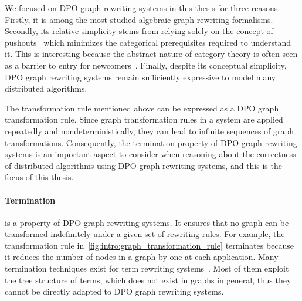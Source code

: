    We focused on DPO graph rewriting systems in this thesis for three reasons.
   Firstly, it is among the most studied algebraic graph rewriting formalisms.
   Secondly, its relative simplicity stems from relying solely on the concept of pushouts~\cite{pierce1991basic} which minimizes the categorical prerequisites required to understand it. This is interesting because the abstract nature of category theory is often seen as a barrier to entry for newcomers~\cite{overbeekthesis}.
    Finally, despite its conceptual simplicity, DPO graph rewriting systems remain sufficiently expressive to model many distributed algorithms.

    The transformation rule mentioned above can be expressed as a DPO graph transformation rule. Since graph transformation rules in a system are applied repeatedly and nondeterministically, they can lead to infinite sequences of graph transformations. 
    Consequently, the termination property of DPO graph rewriting systems is an important aspect to consider when reasoning about the correctness of distributed algorithms using DPO graph rewriting systems, and this is the focus of this thesis.

\paragraph{Termination} is a property of DPO graph rewriting systems. It ensures that no graph can be transformed indefinitely under a given set of rewriting rules. For example, the transformation rule in~\autoref{fig:intro:graph_transformation_rule} terminates because it reduces the number of nodes in a graph by one at each application. 
Many termination techniques exist for term rewriting systems~\cite{nipkow1998term, dershowitz1982orderings, middeldorp1997simple, arts2000termination}. 
 Most of them exploit the tree structure of terms, which does not exist in graphs in general, thus they cannot be directly adapted to DPO graph rewriting systems.

